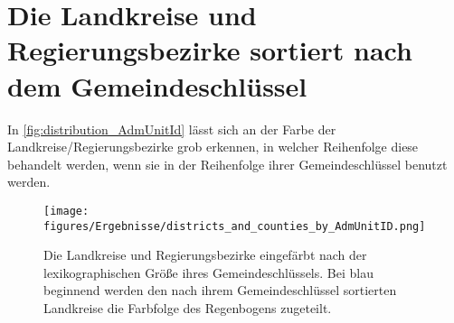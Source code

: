 \section{Die Landkreise und Regierungsbezirke sortiert nach dem Gemeindeschlüssel}
In \autoref{fig:distribution_AdmUnitId} lässt sich an der Farbe der Landkreise/Regierungsbezirke grob erkennen, in welcher Reihenfolge diese behandelt werden, wenn sie in der Reihenfolge ihrer Gemeindeschlüssel benutzt werden.
\begin{figure}[H]
    \centering
    \texttt{[image: figures/Ergebnisse/districts\_and\_counties\_by\_AdmUnitID.png]}
    \caption{Die Landkreise und Regierungsbezirke eingefärbt nach der lexikographischen Größe ihres Gemeindeschlüssels. Bei blau beginnend werden den nach ihrem Gemeindeschlüssel sortierten Landkreise die Farbfolge des Regenbogens zugeteilt.}
    \label{fig:distribution_AdmUnitId}
\end{figure}